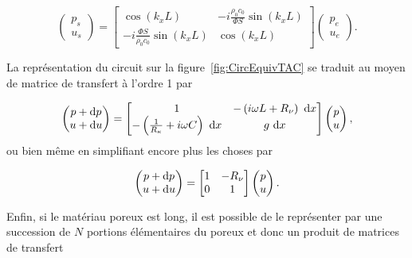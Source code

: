 \begin{equation}
\begin{pmatrix}
p_s\\
u_s
\end{pmatrix} = \begin{bmatrix}
\cos(k_x L) & -i\frac{\rho_0 c_0}{\Phi S}\sin(k_x L)\\
-i\frac{\Phi S}{\rho_0 c_0}\sin(k_x L) & \cos(k_x L)
\end{bmatrix}
\begin{pmatrix}
p_e\\
u_e
\end{pmatrix}.\label{eq:Tmatrix_poreux}
\end{equation}


La représentation du circuit sur la figure~\ref{fig:CircEquivTAC} se traduit au moyen de matrice de transfert à l'ordre 1 par 


\begin{equation}
	\begin{pmatrix}
		p + \mathrm{d} p\\
		u + \mathrm{d} u
	\end{pmatrix} = \begin{bmatrix}
	1 & -\left(i\omega L + R_\nu\right)~\mathrm{d} x  \\
	-\left(\frac{1}{R_\kappa} + i \omega C\right)~\mathrm{d} x & g~\mathrm{d} x \end{bmatrix} \begin{pmatrix}
	p \\
	u
	\end{pmatrix}, \label{eq:TMatrix_NoyauTA}
\end{equation}
ou bien même en simplifiant encore plus les choses par

\begin{equation}
    \begin{pmatrix}
        p + \mathrm{d} p \\
        u + \mathrm{d} u
    \end{pmatrix} = \begin{bmatrix}
    1 & -R_\nu \\
    0 & 1
    \end{bmatrix}\begin{pmatrix}
        p \\
        u
    \end{pmatrix}.
    \label{eq:Tmatrix_NoyauTA_simplifie}
\end{equation}


Enfin, si le matériau poreux est long, il est possible de le représenter par une succession de $N$ portions élémentaires du poreux et donc un produit de matrices de transfert


